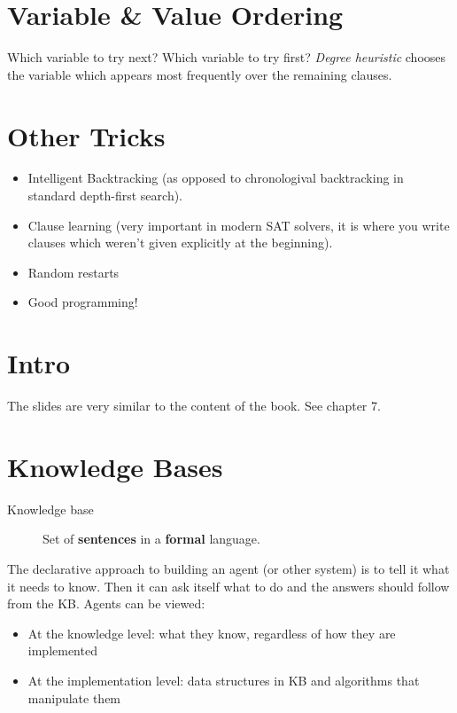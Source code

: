 \documentclass[11pt]{article}
\begin{document}
\section{Variable \& Value Ordering}
\label{sec:orgc13fba5}
Which variable to try next? Which variable to try first?
\emph{Degree heuristic} chooses the variable which appears most frequently over the remaining clauses.

\section{Other Tricks}
\label{sec:orgcf59b2b}
\begin{itemize}
\item Intelligent Backtracking (as opposed to chronologival backtracking in standard depth-first search).
\item Clause learning (very important in modern SAT solvers, it is where you write clauses which weren't given explicitly at the beginning).
\item Random restarts
\item Good programming!
\end{itemize}

\maketitle
\tableofcontents


\section{Intro}
\label{sec:org8ac8ab8}
The slides are very similar to the content of the book.
See chapter 7.

\section{Knowledge Bases}
\label{sec:org21b6bcd}
\begin{description}
\item[{Knowledge base}] Set of \textbf{sentences} in a \textbf{formal} language.
\end{description}
The declarative approach to building an agent (or other system) is to tell it what it needs to know.
Then it can ask itself what to do and the answers should follow from the KB.
Agents can be viewed:
\begin{itemize}
\item At the knowledge level: what they know, regardless of how they are implemented
\item At the implementation level: data structures in KB and algorithms that manipulate them
\end{itemize}
\end{document}
